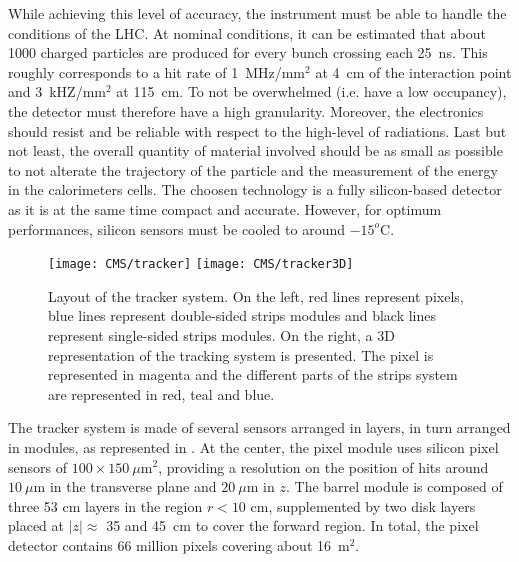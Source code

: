         While achieving this level of accuracy, the instrument must be able to handle the conditions of
        the LHC. At nominal conditions, it can be estimated that about 1000 charged particles
        are produced for every bunch crossing each 25~ns. This roughly corresponds to a
        hit rate of 1~MHz/mm$^2$ at 4~cm of the interaction point and 3~kHZ/mm$^2$ at 115~cm.
        To not be overwhelmed (i.e. have a low occupancy), the detector must therefore
        have a high granularity. Moreover, the electronics should resist and be reliable
        with respect to the high-level of radiations. Last but not least, the overall
        quantity of material involved should be as small as possible to not alterate the
        trajectory of the particle and the measurement of the energy in the calorimeters
        cells. The choosen technology is a fully silicon-based detector as it is at the
        same time compact and accurate. However, for optimum performances, silicon sensors
        must be cooled to around $-15^o$C.

        \begin{figure}[h!]
            \centering
            \texttt{[image: CMS/tracker]}
            \texttt{[image: CMS/tracker3D]}
            \caption{Layout of the tracker system.
            On the left, red lines represent pixels, blue lines represent double-sided
            strips modules and black lines represent single-sided strips modules. On the
            right, a 3D representation of the tracking system is presented. The pixel
            is represented in magenta and the different parts of the strips system are
            represented in red, teal and blue.}
            \label{fig:CMS/tracker}
        \end{figure}

        The tracker system is made of several sensors arranged in layers, in turn arranged
        in modules, as represented in . At the center, the pixel module
        uses silicon pixel sensors of $100 \times 150~\mu\text{m}^2$, providing a resolution
        on the position of hits around $10~\mu\text{m}$ in the transverse plane and
        $20~\mu\text{m}$ in $z$. The barrel module is composed of three 53 cm layers in the
        region $r < 10$ cm, supplemented by two disk layers placed at $\left|z\right| \approx$
        35 and 45~cm to cover the forward region. In total, the pixel detector contains 66
        million pixels covering about 16~m$^2$.


